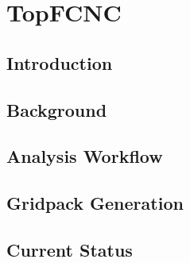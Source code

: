 
\chapter{TopFCNC} %

\label{AppendixB} %

% 
%
\section{Introduction}
\section{Background}
\section{Analysis Workflow}
\section{Gridpack Generation}
\section{Current Status}